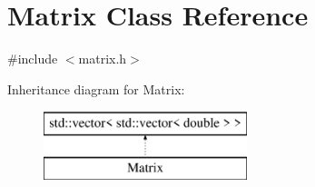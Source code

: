 \hypertarget{class_matrix}{}\section{Matrix Class Reference}
\label{class_matrix}


{\ttfamily \#include $<$matrix.\+h$>$}

Inheritance diagram for Matrix\+:\begin{figure}[H]
\begin{center}
\leavevmode
\includegraphics[height=2.000000cm]{class_matrix}
\end{center}
\end{figure}
